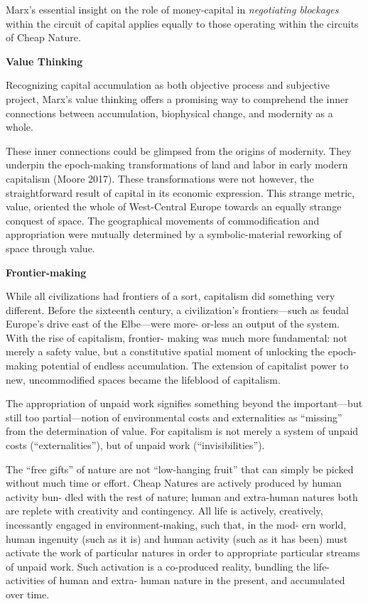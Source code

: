 \documentclass[
]{book}
\begin{document}
Marx's essential insight on
the role of money-capital in \emph{negotiating blockages} within the circuit
of capital applies equally to those operating within the circuits of
Cheap Nature.

\textbf{Value Thinking}

Recognizing capital accumulation as both objective process and
subjective project, Marx's value thinking offers a promising way to
comprehend the inner connections between accumulation, biophysical
change, and modernity as a whole.

These inner connections
could be glimpsed from the origins of modernity. They underpin the
epoch-making transformations of land and labor in early modern
capitalism (Moore 2017). These transformations were not however,
the straightforward result of capital in its economic expression. This
strange metric, value, oriented the whole of West-Central Europe
towards an equally strange conquest of space. The geographical
movements of commodification and appropriation were mutually
determined by a symbolic-material reworking of space through value.

\textbf{Frontier-making}

While all civilizations had frontiers of a sort, capitalism did
something very different. Before the sixteenth century, a civilization's
frontiers---such as feudal Europe's drive east of the Elbe---were more-
or-less an output of the system. With the rise of capitalism, frontier-
making was much more fundamental: not merely a safety value, but
a constitutive spatial moment of unlocking the epoch-making potential
of endless accumulation. The extension of capitalist power to
new, uncommodified spaces became the lifeblood of capitalism.

The appropriation of unpaid work signifies something beyond
the important---but still too partial---notion of environmental costs
and externalities as ``missing'' from the determination of value.
For capitalism is not merely a system of unpaid costs
(``externalities''), but of unpaid work (``invisibilities'').

The ``free gifts'' of nature are
not ``low-hanging fruit'' that can simply be picked without much time
or effort. Cheap Natures are actively produced by human activity bun-
dled with the rest of nature; human and extra-human natures both are
replete with creativity and contingency. All life is actively, creatively,
incessantly engaged in environment-making, such that, in the mod-
ern world, human ingenuity (such as it is) and human activity (such
as it has been) must activate the work of particular natures in order
to appropriate particular streams of unpaid work. Such activation is
a co-produced reality, bundling the life-activities of human and extra-
human nature in the present, and accumulated over time.
\end{document}
